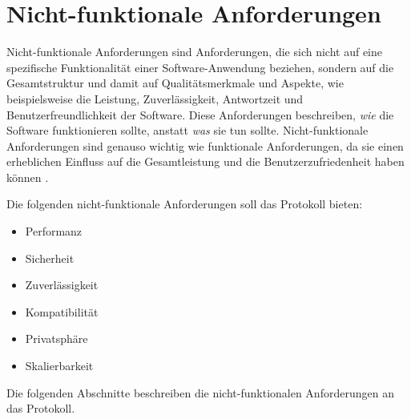 \section{Nicht-funktionale Anforderungen}


Nicht-funktionale Anforderungen sind Anforderungen, die sich nicht auf eine 
spezifische Funktionalität einer Software-Anwendung beziehen, sondern auf die Gesamtstruktur und damit auf
Qualitätsmerkmale und Aspekte, wie beispielsweise die Leistung, Zuverlässigkeit, Antwortzeit und Benutzerfreundlichkeit 
der Software. 
Diese Anforderungen beschreiben, \textit{wie} die Software funktionieren sollte, anstatt \textit{was} sie tun sollte. 
Nicht-funktionale Anforderungen sind genauso wichtig wie funktionale Anforderungen, da sie einen 
erheblichen Einfluss auf die Gesamtleistung und die Benutzerzufriedenheit haben können
\parencite[S. 126-130]{Sommerville_AnfAnalyse}.

\noindent Die folgenden nicht-funktionale Anforderungen soll das Protokoll bieten:

\begin{itemize}
    \item Performanz
    \item Sicherheit
    \item Zuverlässigkeit
    \item Kompatibilität
    \item Privatsphäre
    \item Skalierbarkeit
\end{itemize}

\noindent Die folgenden Abschnitte beschreiben die nicht-funktionalen Anforderungen an das Protokoll.



